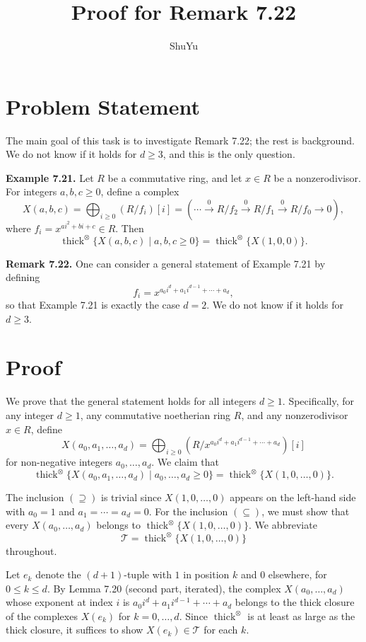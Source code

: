 \documentclass[11pt]{article}
\title{Proof for Remark 7.22}
\author{ShuYu}
\date{}
\newcommand{\TT}{\mathcal{T}}
\newcommand{\thicktensor}[1]{\operatorname{thick}^{\otimes}\{#1\}}
\begin{document}
\maketitle

\section*{Problem Statement}

The main goal of this task is to investigate Remark 7.22; the rest is background. We do not know if it holds for $d \geqslant 3$, and this is the only question.

\medskip

\noindent\textbf{Example 7.21.}
Let $R$ be a commutative ring, and let $x \in R$ be a nonzerodivisor. For integers $a,b,c \geqslant 0$, define a complex
\[
X(a,b,c)=\bigoplus_{i \geqslant 0}(R/f_i)[i]
=\left(\cdots \xrightarrow{0} R/f_2 \xrightarrow{0} R/f_1 \xrightarrow{0} R/f_0 \to 0\right),
\]
where $f_i=x^{a i^2+b i+c} \in R$. Then
\[
\thicktensor{X(a,b,c)\mid a,b,c \geqslant 0}
=
\thicktensor{X(1,0,0)}.
\]

\medskip

\noindent\textbf{Remark 7.22.}
One can consider a general statement of Example 7.21 by defining
\[
f_i=x^{a_0 i^d+a_1 i^{d-1}+\cdots+a_d},
\]
so that Example 7.21 is exactly the case $d=2$. We do not know if it holds for $d \geqslant 3$.

\section*{Proof}

We prove that the general statement holds for all integers $d \geqslant 1$. Specifically, for any integer $d \geqslant 1$, any commutative noetherian ring $R$, and any nonzerodivisor $x \in R$, define
\[
X(a_0,a_1,\ldots,a_d)
=
\bigoplus_{i \geqslant 0}\left(R/x^{a_0 i^d + a_1 i^{d-1} + \cdots + a_d}\right)[i]
\]
for non-negative integers $a_0,\ldots,a_d$. We claim that
\[
\thicktensor{X(a_0,a_1,\ldots,a_d)\mid a_0,\ldots,a_d \geqslant 0}
=
\thicktensor{X(1,0,\ldots,0)}.
\]

The inclusion $(\supseteq)$ is trivial since $X(1,0,\ldots,0)$ appears on the left-hand side with $a_0=1$ and $a_1=\cdots=a_d=0$. For the inclusion $(\subseteq)$, we must show that every $X(a_0,\ldots,a_d)$ belongs to $\thicktensor{X(1,0,\ldots,0)}$. We abbreviate
\[
\TT=\thicktensor{X(1,0,\ldots,0)}
\]
throughout.

Let $e_k$ denote the $(d+1)$-tuple with $1$ in position $k$ and $0$ elsewhere, for $0 \leqslant k \leqslant d$. By Lemma 7.20 (second part, iterated), the complex $X(a_0,\ldots,a_d)$ whose exponent at index $i$ is $a_0 i^d + a_1 i^{d-1} + \cdots + a_d$ belongs to the thick closure of the complexes $X(e_k)$ for $k=0,\ldots,d$. Since $\operatorname{thick}^{\otimes}$ is at least as large as the thick closure, it suffices to show $X(e_k) \in \TT$ for each $k$.
\end{document}
